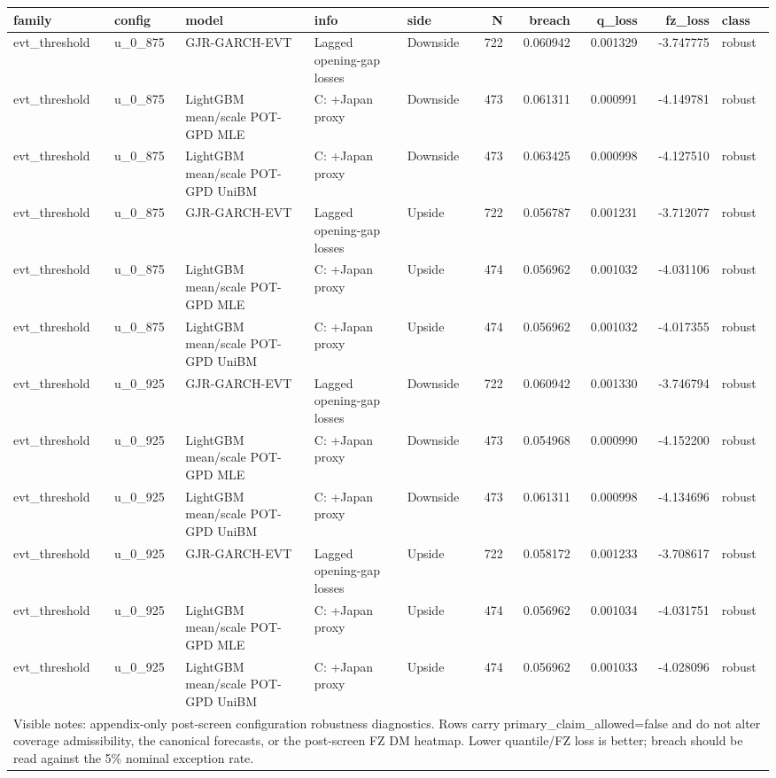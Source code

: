 \begin{tabular}{lll l lrrrrl}
\toprule
family & config & model & info & side & N & breach & q_loss & fz_loss & class \\
\midrule
evt\_threshold & u\_0\_875 & GJR-GARCH-EVT & Lagged opening-gap losses & Downside & 722 & 0.060942 & 0.001329 & -3.747775 & robust \\
evt\_threshold & u\_0\_875 & LightGBM mean/scale POT-GPD MLE & C: +Japan proxy & Downside & 473 & 0.061311 & 0.000991 & -4.149781 & robust \\
evt\_threshold & u\_0\_875 & LightGBM mean/scale POT-GPD UniBM & C: +Japan proxy & Downside & 473 & 0.063425 & 0.000998 & -4.127510 & robust \\
evt\_threshold & u\_0\_875 & GJR-GARCH-EVT & Lagged opening-gap losses & Upside & 722 & 0.056787 & 0.001231 & -3.712077 & robust \\
evt\_threshold & u\_0\_875 & LightGBM mean/scale POT-GPD MLE & C: +Japan proxy & Upside & 474 & 0.056962 & 0.001032 & -4.031106 & robust \\
evt\_threshold & u\_0\_875 & LightGBM mean/scale POT-GPD UniBM & C: +Japan proxy & Upside & 474 & 0.056962 & 0.001032 & -4.017355 & robust \\
evt\_threshold & u\_0\_925 & GJR-GARCH-EVT & Lagged opening-gap losses & Downside & 722 & 0.060942 & 0.001330 & -3.746794 & robust \\
evt\_threshold & u\_0\_925 & LightGBM mean/scale POT-GPD MLE & C: +Japan proxy & Downside & 473 & 0.054968 & 0.000990 & -4.152200 & robust \\
evt\_threshold & u\_0\_925 & LightGBM mean/scale POT-GPD UniBM & C: +Japan proxy & Downside & 473 & 0.061311 & 0.000998 & -4.134696 & robust \\
evt\_threshold & u\_0\_925 & GJR-GARCH-EVT & Lagged opening-gap losses & Upside & 722 & 0.058172 & 0.001233 & -3.708617 & robust \\
evt\_threshold & u\_0\_925 & LightGBM mean/scale POT-GPD MLE & C: +Japan proxy & Upside & 474 & 0.056962 & 0.001034 & -4.031751 & robust \\
evt\_threshold & u\_0\_925 & LightGBM mean/scale POT-GPD UniBM & C: +Japan proxy & Upside & 474 & 0.056962 & 0.001033 & -4.028096 & robust \\
\midrule
\multicolumn{10}{l}{\footnotesize Visible notes: appendix-only post-screen configuration robustness diagnostics. Rows carry primary\_claim\_allowed=false and do not alter coverage admissibility, the canonical forecasts, or the post-screen FZ DM heatmap. Lower quantile/FZ loss is better; breach should be read against the 5\% nominal exception rate.} \\
\bottomrule
\end{tabular}
